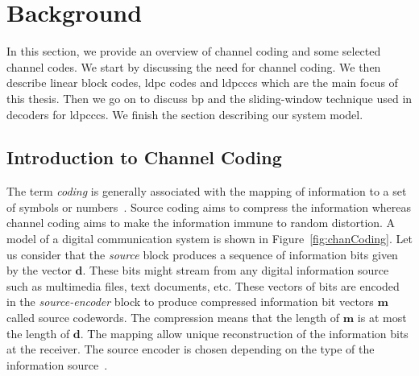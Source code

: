 \section{Background}
In this section, we provide an overview of channel coding and some selected channel codes. We start by discussing the need for channel coding. We then describe linear block codes, \ac{ldpc} codes and \acp{ldpccc} which are the main focus of this thesis. Then we go on to discuss \ac{bp} and the sliding-window technique used in decoders for \acp{ldpccc}. We finish the section describing our system model.

\subsection{Introduction to Channel Coding}
The term \emph{coding} is generally associated with the mapping of information to a set of symbols or numbers~\cite{Bossert}. Source coding aims to compress the information whereas channel coding aims to make the information immune to random distortion. A model of a digital communication system is shown in Figure~\ref{fig:chanCoding}. Let us consider that the \emph{source} block produces a sequence of information bits given by the vector $\mathbf{d}$. These bits might stream from any digital information source such as multimedia files, text documents, etc. These vectors of bits are encoded in the \emph{source-encoder} block to produce compressed information bit vectors $\mathbf{m}$ called source codewords. The compression means that the length of $\mathbf{m}$ is at most the length of $\mathbf{d}$. The mapping allow unique reconstruction of the information bits at the receiver. The source encoder is chosen depending on the type of the information source~\cite{proak}.

